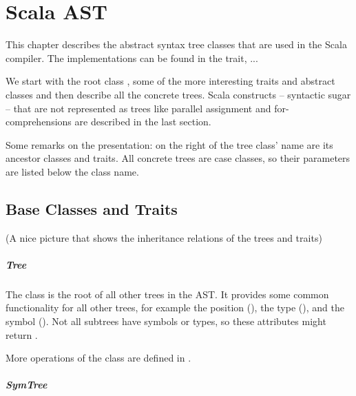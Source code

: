 \chapter{Scala AST}

This chapter describes the abstract syntax tree classes that are used in the Scala compiler. The implementations can be found in the  trait, ...

We start with the root class , some of the more interesting traits and abstract classes and then describe all the concrete trees. Scala constructs -- syntactic sugar -- that are not represented as trees like parallel assignment and for-comprehensions are described in the last section.

Some remarks on the presentation: on the right of the tree class' name are its ancestor classes and traits. All concrete trees are case classes, so their parameters are listed below the class name.

\newcommand{\member} [2] {\hfill \begin{footnotesize}\src{#1} \newline \vspace{5pt} \src{#2}\end{footnotesize}\vspace{5pt}}

\section{Base Classes and Traits}

(A nice picture that shows the inheritance relations of the trees and traits)

\paragraph{Tree} \hfill \newline

\noindent The  class is the root of all other trees in the AST. It provides some common functionality for all other trees, for example the position (), the type (), and the symbol (). Not all subtrees have symbols or types, so these attributes might return .

More operations of the  class are defined in .

\paragraph{SymTree} \hfill \begin{footnotesize}\end{footnotesize} \newline

